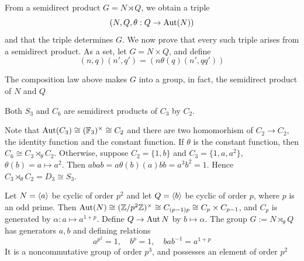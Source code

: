 \documentclass[11pt]{article}
\begin{document}
From a semidirect product \(G=N\rtimes Q\), we obtain a triple
\begin{equation*}
(N,Q,\theta:Q\to\operatorname{\text{Aut}}(N))
\end{equation*}
and that the triple determines \(G\). We now prove that every such triple arises from a
semidirect product. As a set, let \(G=N\times Q\), and define
\begin{equation*}
(n,q)(n',q')=(n\theta(q)(n',qq'))
\end{equation*}
\begin{proposition}[]
The composition law above makes \(G\) into a group, in fact, the semidirect product of \(N\) and \(Q\)
\end{proposition}

\begin{examplle}
Both \(S_3\) and \(C_6\) are semidirect products of \(C_3\) by \(C_2\).

Note that \(\operatorname{\text{Aut}}(C_3)\cong(\mathbb{F}_3)^\times\cong C_2\) and there are two homomorhism of \(C_2\to C_2\), the identity
function and the constant function. If \(\theta\) is the constant function, then \(C_6\cong C_3\rtimes_\theta C_2\).
Otherwise, suppose \(C_2=\{1,b\}\) and \(C_3=\{1,a,a^2\}\), \(\theta(b)=a\mapsto a^2\). Then
\(abab=a\theta(b)(a)bb=a^3b^2=1\). Hence \(C_3\rtimes_\theta C_2=D_3\cong S_3\).
\end{examplle}

\begin{examplle}
\label{3.14}
Let \(N=\langle a\rangle\) be cyclic of order \(p^2\) and let \(Q=\langle b\rangle\) be cyclic of order \(p\),
where \(p\) is an odd prime. Then \(\operatorname{\text{Aut}}(N)\cong(\mathbb{Z}/p^2\mathbb{Z})^\times\cong C_{(p-1)p}\cong C_p\times C_{p-1}\), and \(C_p\)
is generated by \(\alpha:a\mapsto a^{1+p}\). Define \(Q\to\operatorname{\text{Aut}} N\) by \(b\mapsto\alpha\). The
group \(G:=N\rtimes_\theta Q\) has generators \(a,b\) and defining relations
\begin{equation*}
a^{p^2}=1,\quad b^p=1,\quad bab^{-1}=a^{1+p}
\end{equation*}
It is a noncommutative group of order \(p^3\), and possesses an element of order \(p^2\)
\end{examplle}
\end{document}
